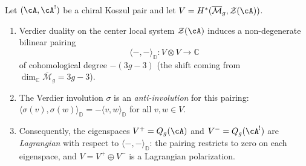 \begin{proposition}
\label{prop:lagrangian-eigenspaces}
Let $(\cA, \cA^!)$ be a chiral Koszul pair and let
$V = H^*(\overline{\mathcal{M}}_g, \mathcal{Z}(\cA))$.
\begin{enumerate}[label=\textup{(\roman*)}]
\item Verdier duality on the center local system $\mathcal{Z}(\cA)$
  induces a non-degenerate bilinear pairing
  \[
  \langle -, - \rangle_{\mathbb{D}} \colon V \otimes V \to \mathbb{C}
  \]
  of cohomological degree $-(3g-3)$ \textup{(}the shift coming from
  $\dim_{\mathbb{C}} \overline{\mathcal{M}}_g = 3g-3$\textup{)}.
\item The Verdier involution $\sigma$ is an \emph{anti-involution}
  for this pairing:
  $\langle \sigma(v), \sigma(w) \rangle_{\mathbb{D}} = -\langle v, w \rangle_{\mathbb{D}}$
  for all $v, w \in V$.
\item Consequently, the eigenspaces
  $V^+ = Q_g(\cA)$ and $V^- = Q_g(\cA^!)$
  are \emph{Lagrangian} with respect to
  $\langle -, - \rangle_{\mathbb{D}}$: the pairing restricts to
  zero on each eigenspace, and $V = V^+ \oplus V^-$ is a Lagrangian
  polarization.
\end{enumerate}
\end{proposition}

